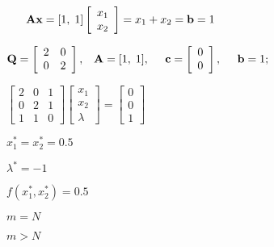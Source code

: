 \documentclass{article}
\def\lthtmlcheckvsize{\ifdim\ht\sizebox<\vsize 
  \ifdim\wd\sizebox<\hsize\expandafter\hfill\fi \expandafter\vfill
  \else\expandafter\vss\fi}%
\begin{document}
{\newpage\clearpage
{}%
$\displaystyle \;\;\;\;\;\;
{\bf Ax}=[1,\;1]\left[\begin{array}{c}x_1\\x_2\end{array}\right]
=x_1+x_2={\bf b}=1$%
\lthtmlindisplaymathZ
\lthtmlcheckvsize\clearpage}

{\newpage\clearpage
{}%
$\displaystyle {\bf Q}=\left[\begin{array}{cc}2&0\\0&2\end{array}\right],\;\;\;
{\bf A}=[1,\;1],\;\;\;\;\;
{\bf c}=\left[\begin{array}{c}0\\0\end{array}\right],\;\;\;\;\;
{\bf b}=1;$%
\lthtmlindisplaymathZ
\lthtmlcheckvsize\clearpage}

{\newpage\clearpage
{}%
$\displaystyle \left[\begin{array}{rrr}2&0&1\\0&2&1\\1&1&0\end{array}\right]
\left[\begin{array}{r}x_1\\x_2\\\lambda\end{array}\right]
=\left[\begin{array}{r}0\\0\\1\end{array}\right]$%
\lthtmlindisplaymathZ
\lthtmlcheckvsize\clearpage}

{\newpage\clearpage
{}%
$ x^*_1=x^*_2=0.5$%
\lthtmlindisplaymathZ
\lthtmlcheckvsize\clearpage}

{\newpage\clearpage
{}%
$ \lambda^*=-1$%
\lthtmlindisplaymathZ
\lthtmlcheckvsize\clearpage}

{\newpage\clearpage
{}%
$ f(x^*_1,x^*_2)=0.5$%
\lthtmlindisplaymathZ
\lthtmlcheckvsize\clearpage}

{\newpage\clearpage
{}%
$ m=N$%
\lthtmlindisplaymathZ
\lthtmlcheckvsize\clearpage}

{\newpage\clearpage
{}%
$ m>N$%
\lthtmlindisplaymathZ
\lthtmlcheckvsize\clearpage}
\end{document}
